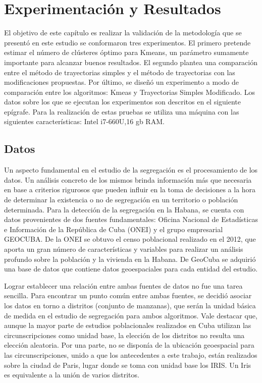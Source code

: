 
\chapter{Experimentación y Resultados} 
El objetivo de este capítulo es realizar la validación de la metodología que se presentó en este estudio se conformaron tres experimentos. El primero pretende estimar el número de clústeres óptimo para Kmeans, un parámetro sumamente importante para alcanzar buenos resultados. El segundo plantea una comparación entre el método de trayectorias simples y el método de trayectorias con las modificaciones propuestas. Por último, se diseñó un experimento a modo de comparación entre los algoritmos: Kmeas y Trayectorias Simples Modificado.
Los datos sobre los que se ejecutan los experimentos son descritos en el siguiente epígrafe. Para la realización de estas pruebas se utiliza una máquina con las siguientes características: Intel i7-660U,16 gb RAM.

\section{Datos}
Un aspecto fundamental en el estudio de la segregación es el procesamiento de los datos. Un análisis concreto de los mismos brinda información más que necesaria en base a criterios rigurosos que pueden influir en la toma de decisiones a la hora de determinar la existencia o no de segregación en un territorio o población determinada. Para la detección de la segregación en la Habana, se cuenta con datos provenientes de dos fuentes fundamentales: Oficina Nacional de Estadísticas e Información de la República de Cuba (ONEI) y el grupo empresarial GEOCUBA. De la ONEI se obtuvo el censo poblacional realizado en el 2012, que aporta un gran número de características y variables para realizar un análisis profundo sobre la población y la vivienda en la Habana. De GeoCuba se adquirió una base de datos que contiene datos geoespaciales para cada entidad del estudio.

Lograr establecer una relación entre ambas fuentes de datos no fue una tarea sencilla. Para encontrar un punto común entre ambas fuentes, se decidió asociar los datos en torno a distritos (conjunto de manzanas), que serán la unidad básica de medida en el estudio de segregación para ambos algoritmos. Vale destacar que, aunque la mayor parte de estudios poblacionales realizados en Cuba utilizan las circunscripciones como unidad base, la elección de los distritos no resulta una elección aleatoria. Por una parte, no se disponía de la ubicación geoespacial para las circunscripciones, unido a que los antecedentes a este trabajo, están realizados sobre la ciudad de Paris, lugar donde se toma con unidad base los IRIS. Un Iris es equivalente a la unión de varios distritos. 

